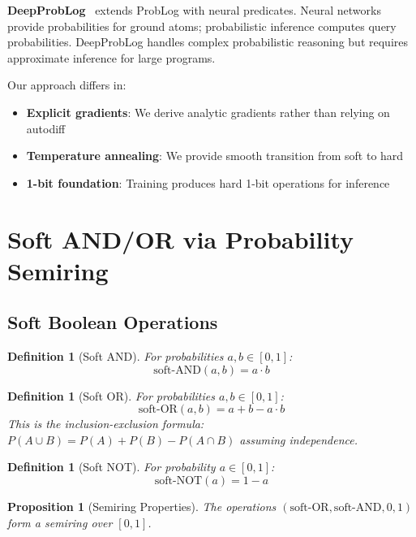 \documentclass[11pt,a4paper]{article}
\newtheorem{definition}[theorem]{Definition}
\newtheorem{proposition}[theorem]{Proposition}
\begin{document}
\textbf{DeepProbLog}~\cite{deepproblog_chirho} extends ProbLog with neural predicates.
Neural networks provide probabilities for ground atoms; probabilistic inference computes query probabilities.
DeepProbLog handles complex probabilistic reasoning but requires approximate inference for large programs.

Our approach differs in:
\begin{itemize}
  \item \textbf{Explicit gradients}: We derive analytic gradients rather than relying on autodiff
  \item \textbf{Temperature annealing}: We provide smooth transition from soft to hard
  \item \textbf{1-bit foundation}: Training produces hard 1-bit operations for inference
\end{itemize}

\section{Soft AND/OR via Probability Semiring}
\label{sec:soft_ops_chirho}

\subsection{Soft Boolean Operations}
\label{subsec:soft_bool_chirho}

\begin{definition}[Soft AND]
\label{def:soft_and_chirho}
For probabilities $a, b \in [0, 1]$:
\[
\text{soft-AND}(a, b) = a \cdot b
\]
\end{definition}

\begin{definition}[Soft OR]
\label{def:soft_or_chirho}
For probabilities $a, b \in [0, 1]$:
\[
\text{soft-OR}(a, b) = a + b - a \cdot b
\]
This is the inclusion-exclusion formula: $P(A \cup B) = P(A) + P(B) - P(A \cap B)$ assuming independence.
\end{definition}

\begin{definition}[Soft NOT]
\label{def:soft_not_chirho}
For probability $a \in [0, 1]$:
\[
\text{soft-NOT}(a) = 1 - a
\]
\end{definition}

\begin{proposition}[Semiring Properties]
\label{prop:semiring_properties_chirho}
The operations $(\text{soft-OR}, \text{soft-AND}, 0, 1)$ form a semiring over $[0, 1]$.
\end{proposition}
\end{document}
